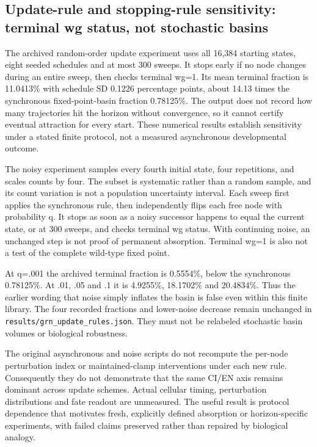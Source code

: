 \subsection{Update-rule and stopping-rule sensitivity: terminal wg status, not stochastic basins}
The archived random-order update experiment uses all 16,384 starting states, eight seeded schedules and at most 300 sweeps. It stops early if no node changes during an entire sweep, then checks terminal wg=1. Its mean terminal fraction is 11.0413\% with schedule SD 0.1226 percentage points, about 14.13 times the synchronous fixed-point-basin fraction 0.78125\%. The output does not record how many trajectories hit the horizon without convergence, so it cannot certify eventual attraction for every start. These numerical results establish sensitivity under a stated finite protocol, not a measured asynchronous developmental outcome.

The noisy experiment samples every fourth initial state, four repetitions, and scales counts by four. The subset is systematic rather than a random sample, and its count variation is not a population uncertainty interval. Each sweep first applies the synchronous rule, then independently flips each free node with probability q. It stops as soon as a noisy successor happens to equal the current state, or at 300 sweeps, and checks terminal wg status. With continuing noise, an unchanged step is not proof of permanent absorption. Terminal wg=1 is also not a test of the complete wild-type fixed point.

At q=.001 the archived terminal fraction is 0.5554\%, below the synchronous 0.78125\%. At .01, .05 and .1 it is 4.9255\%, 18.1702\% and 20.4834\%. Thus the earlier wording that noise simply inflates the basin is false even within this finite library. The four recorded fractions and lower-noise decrease remain unchanged in \texttt{results/grn\_update\_rules.json}. They must not be relabeled stochastic basin volumes or biological robustness.

The original asynchronous and noise scripts do not recompute the per-node perturbation index or maintained-clamp interventions under each new rule. Consequently they do not demonstrate that the same CI/EN axis remains dominant across update schemes. Actual cellular timing, perturbation distributions and fate readout are unmeasured. The useful result is protocol dependence that motivates fresh, explicitly defined absorption or horizon-specific experiments, with failed claims preserved rather than repaired by biological analogy.

